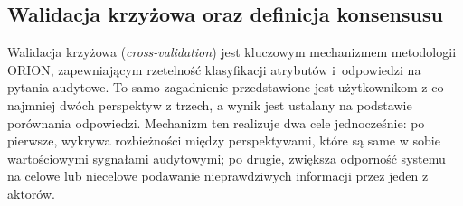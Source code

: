 \subsection{Walidacja krzyżowa oraz definicja konsensusu}
\label{sec:crossvalidation}
Walidacja krzyżowa (\textit{cross-validation}) jest kluczowym mechanizmem metodologii ORION, zapewniającym rzetelność klasyfikacji atrybutów i~odpowiedzi na pytania audytowe. To samo zagadnienie przedstawione jest użytkownikom z co najmniej dwóch perspektyw z trzech, a wynik jest ustalany na podstawie porównania odpowiedzi.
Mechanizm ten realizuje dwa cele jednocześnie: po pierwsze, wykrywa rozbieżności między perspektywami, które są
same w sobie wartościowymi sygnałami audytowymi; po drugie, zwiększa odporność systemu na celowe lub niecelowe podawanie nieprawdziwych informacji przez jeden z aktorów.


